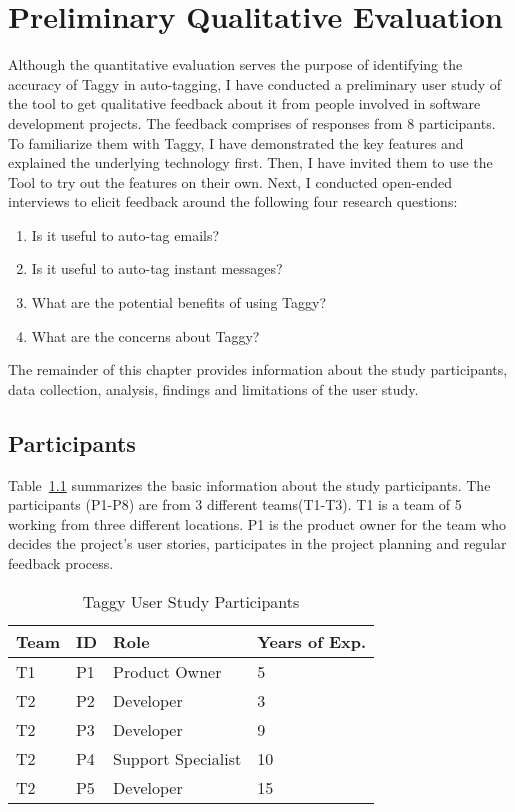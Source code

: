 \fancyhead[RO,LE]{\thepage}
\fancyfoot{} 
\chapter{Preliminary Qualitative Evaluation}
Although the quantitative evaluation serves the purpose of identifying the accuracy of Taggy in auto-tagging, I have conducted a preliminary user study of the tool to get qualitative feedback about it from people involved in software development projects. The feedback comprises of responses from 8 participants. To familiarize them with Taggy, I have demonstrated the key features and explained the underlying technology first. Then, I have invited them to use the Tool to try out the features on their own. Next, I conducted open-ended interviews to elicit feedback around the following four research questions:

\begin{enumerate}
	\item Is it useful to auto-tag emails?
	\item Is it useful to auto-tag instant messages?
	\item What are the potential benefits of using Taggy?
	\item What are the concerns about Taggy?
\end{enumerate}

The remainder of this chapter provides information about the study participants, data collection, analysis, findings and limitations of the user study.

\section{Participants}
Table~\ref{tab:participants} summarizes the basic information about the study participants. The participants (P1-P8) are from 3 different teams(T1-T3). T1 is a team of 5 working from three different locations. P1 is the product owner for the team who decides the project's user stories, participates in the project planning and regular feedback process. 

\begin{table}
	\label{tab:participants}
  \centering
  \caption{Taggy User Study Participants}
    \begin{tabular}{|p{2cm}|p{2cm}|p{4cm}|p{2cm}|}
    \hline
		Team & ID & Role & Years of Exp.\\
		\hline
		T1	&  P1 & Product Owner & 5 \\
		T2	&  P2 & Developer & 3 \\
		T2	&  P3 & Developer & 9 \\
		T2	&  P4 & Support Specialist & 10 \\
		T2	&  P5 & Developer & 15\\		
		\hline
		\end{tabular}
\end{table}                                              

